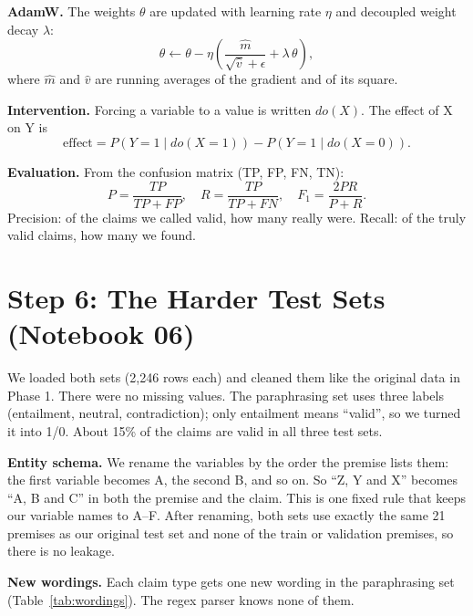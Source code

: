 \documentclass[conference]{IEEEtran}
\begin{document}
\textbf{AdamW.} The weights $\theta$ are updated with learning rate $\eta$ and decoupled weight decay $\lambda$:
\begin{equation}
\theta \leftarrow \theta - \eta\left(\frac{\hat m}{\sqrt{\hat v}+\epsilon} + \lambda\,\theta\right),
\end{equation}
where $\hat m$ and $\hat v$ are running averages of the gradient and of its square.

\textbf{Intervention.} Forcing a variable to a value is written $do(X)$. The effect of X on Y is
\begin{equation}
\text{effect} = P(Y{=}1 \mid do(X{=}1)) - P(Y{=}1 \mid do(X{=}0)).
\end{equation}

\textbf{Evaluation.} From the confusion matrix (TP, FP, FN, TN):
\begin{equation}
P = \frac{TP}{TP+FP},\quad R = \frac{TP}{TP+FN},\quad F_1 = \frac{2PR}{P+R}.
\end{equation}
Precision: of the claims we called valid, how many really were. Recall: of the truly valid claims, how many we found.

\section{Step 6: The Harder Test Sets (Notebook 06)}
We loaded both sets (2{,}246 rows each) and cleaned them like the original data in Phase 1. There were no missing values. The paraphrasing
set uses three labels (entailment, neutral, contradiction); only entailment means ``valid'', so we turned it into
1/0. About 15\% of the claims are valid in all three test sets.

\textbf{Entity schema.} We rename the variables by the order the premise lists them: the first variable becomes A,
the second B, and so on. So ``Z, Y and X'' becomes ``A, B and C'' in both the premise and the claim. This is one
fixed rule that keeps our variable names to A--F. After renaming, both sets use exactly the same 21 premises as our
original test set and none of the train or validation premises, so there is no leakage.

\textbf{New wordings.} Each claim type gets one new wording in the paraphrasing set (Table~\ref{tab:wordings}).
The regex parser knows none of them.
\end{document}
